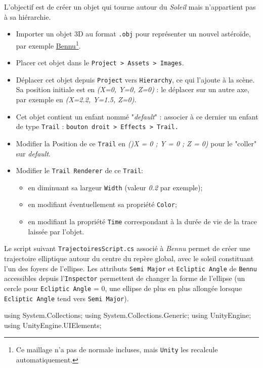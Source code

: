 \documentclass[a4paper,10pt]{article}
\newenvironment{solution}%
{\begin{tcolorbox}[breakable,colback=red!5!white,colframe=red!75!black,title=Solution]}%
{\end{tcolorbox}}
\newenvironment{boxcode}%
{\begin{tcolorbox}[breakable,colback=gray!5!white,colframe=black]}%
	{\end{tcolorbox}}
\begin{document}
\ifversionenseignant
\begin{solution}
L'objectif est de créer un objet qui tourne autour du \textit{Soleil} mais n'appartient pas à sa hiérarchie.

\begin{itemize}
	\item Importer un objet 3D au format \texttt{.obj} pour représenter un nouvel astéroïde, par exemple \href{https://nasa3d.arc.nasa.gov/detail/bennu}{Bennu}\footnote{Ce maillage n'a pas de normale incluses, mais \texttt{Unity} les recalcule automatiquement.}.
	\item Placer cet objet dans le \texttt{Project > Assets > Images}.
	\item Déplacer cet objet depuis \texttt{Project} vers \texttt{Hierarchy}, ce qui l'ajoute à la scène. Sa position initiale est en \textit{(X=0, Y=0, Z=0)} : le déplacer sur un autre axe, par exemple en \textit{(X=2.2, Y=1.5, Z=0)}.
	\item Cet objet contient un enfant nommé "\textit{default}" : associer à ce dernier un enfant de type \texttt{Trail} : \texttt{bouton droit > Effects > Trail.} 
	\item Modifier la Position de ce \texttt{Trail} en \textit{()X = 0 ; Y = 0 ; Z = 0)} pour le "coller" sur \textit{default}.
	\item Modifier le \texttt{Trail Renderer} de ce \texttt{Trail}:
	\begin{itemize}
		\item en diminuant sa largeur \texttt{Width} (valeur \textit{0.2} par exemple);
		\item en modifiant éventuellement sa propriété \texttt{Color};
		\item en modifiant la propriété \texttt{Time} correspondant à la durée de vie de la trace laissée par l'objet.
	\end{itemize}
\end{itemize}

Le script suivant \texttt{TrajectoiresScript.cs} associé à \textit{Bennu} permet de créer une trajectoire elliptique autour du centre du repère global, avec le soleil constituant l'un des foyers de l'ellipse. Les attributs \texttt{Semi Major} et \texttt{Ecliptic Angle} de \texttt{Bennu} accessibles depuis l'\texttt{Inspector} permettent de changer la forme de l'ellipse (un cercle pour \texttt{Ecliptic Angle} = $0$, une ellipse de plus en plus allongée lorsque \texttt{Ecliptic Angle} tend vers \texttt{Semi Major}).

\begin{boxcode}
	\begin{csharpsansbord}
using System.Collections;
using System.Collections.Generic;
using UnityEngine;
using UnityEngine.UIElements;


\end{csharpsansbord}
\end{boxcode}
\end{solution}
\end{document}
